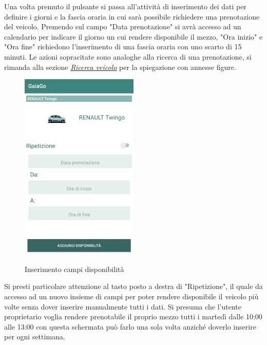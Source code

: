 Una volta premuto il pulsante si passa all'attività di inserimento dei dati per definire i giorni e la fascia oraria in cui sarà possibile richiedere una prenotazione del veicolo. Premendo sul campo "Data prenotazione" si avrà accesso ad un calendario per indicare il giorno un cui rendere disponibile il mezzo, "Ora inizio" e "Ora fine" richiedono l'inserimento di una fascia oraria con uno scarto di 15 minuti.
Le azioni sopracitate sono analoghe alla ricerca di una prenotazione, si rimanda alla sezione \textit{\hyperref[sec:hello]{Ricerca veicolo}} per la spiegazione con annesse figure.
 \begin{figure}[H] 
	\centering 
	\includegraphics[width=0.5\textwidth]{res/images/aggiungi_disponibilita2.png}\\
	\caption{Inserimento campi disponibilità}
	\label{campi disponibilità}
\end{figure}
\pagebreak

Si presti particolare attenzione al tasto posto a destra di "Ripetizione", il quale da accesso ad un nuovo insieme di campi per poter rendere disponibile il veicolo più volte senza dover inserire manualmente tutti i dati. Si presuma che l'utente proprietario voglia rendere prenotabile il proprio mezzo tutti i martedì dalle 10:00 alle 13:00 con questa schermata può farlo una sola volta anziché doverlo inserire per ogni settimana.

